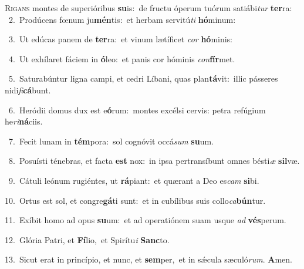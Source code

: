 \lettrine{\initial\textcolor{\initialcolor}{R}}{igans} montes de superióribus \textbf{su}\-is:~\star de fructu óperum tuórum satiábi\textit{tur} \textbf{ter}\-ra:\\
{\numbfont\textcolor{\numbcolor}{~2.}}~Prodúcens fœnum ju\-\textbf{mén}\-tis:~\star et herbam servitú\textit{ti} \textbf{hó}\-minum:\par
{\numbfont\textcolor{\numbcolor}{~3.}}~Ut edúcas panem de \textbf{ter}\-ra:~\star et vinum lætíficet \textit{cor} \textbf{hó}\-minis:\par
{\numbfont\textcolor{\numbcolor}{~4.}}~Ut exhílaret fáciem in \textbf{ó}\-leo:~\star et panis cor hóminis \textit{con}\-\textbf{fír}met.\par
{\numbfont\textcolor{\numbcolor}{~5.}}~Saturabúntur ligna campi, et cedri Líbani, quas plan\-\textbf{tá}\-vit:~\star illic pásseres nidi\-\textit{fi}\-\textbf{cá}bunt.\par
{\numbfont\textcolor{\numbcolor}{~6.}}~Heródii domus dux est e\-\textbf{ó}\-rum:~\star montes excélsi cervis: petra refúgium he\-\textit{ri}\-\textbf{ná}ciis.\par
{\numbfont\textcolor{\numbcolor}{~7.}}~Fecit lunam in \textbf{tém}\-pora:~\star sol cognóvit occá\textit{sum} \textbf{su}\-um.\par
{\numbfont\textcolor{\numbcolor}{~8.}}~Posuísti ténebras, et facta \textbf{est} nox:~\star in ipsa pertransíbunt omnes bésti\textit{æ} \textbf{sil}\-væ.\par
{\numbfont\textcolor{\numbcolor}{~9.}}~Cátuli leónum rugiéntes, ut \textbf{rá}\-piant:~\star et quærant a Deo es\textit{cam} \textbf{si}\-bi.\par
{\numbfont\textcolor{\numbcolor}{10.}}~Ortus est sol, et congre\-\textbf{gá}\-ti sunt:~\star et in cubílibus suis collo\-\textit{ca}\-\textbf{bún}tur.\par
{\numbfont\textcolor{\numbcolor}{11.}}~Exíbit homo ad opus \textbf{su}\-um:~\star et ad operatiónem suam usque \textit{ad} \textbf{vés}\-perum.\par
{\numbfont\textcolor{\numbcolor}{12.}}~Glória Patri, et \textbf{Fí}\-lio,~\star et Spirítu\textit{i} \textbf{Sanc}\-to.\par
{\numbfont\textcolor{\numbcolor}{13.}}~Sicut erat in princípio, et nunc, et \textbf{sem}\-per,~\star et in sǽcula sæculó\-\textit{rum}\-. \textbf{A}\-men.\par
